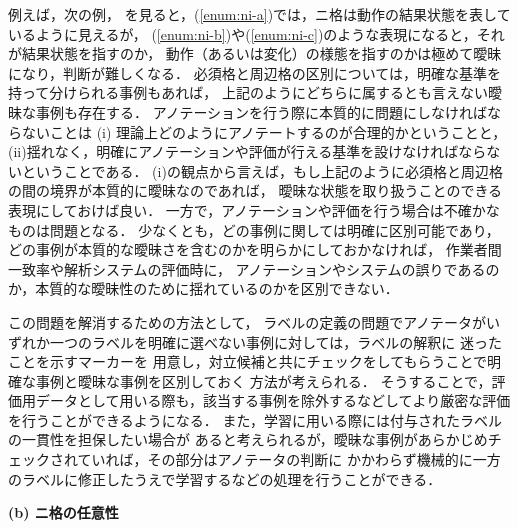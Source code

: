 \documentclass[japanese]{jnlp_1.4}
\begin{document}
例えば，次の例，
を見ると，(\ref{enum:ni-a})では，ニ格は動作の結果状態を表しているように見えるが，
(\ref{enum:ni-b})や(\ref{enum:ni-c})のような表現になると，それが結果状態を指すのか，
動作（あるいは変化）の様態を指すのかは極めて曖昧になり，判断が難しくなる．
必須格と周辺格の区別については，明確な基準を持って分けられる事例もあれば，
上記のようにどちらに属するとも言えない曖昧な事例も存在する．
アノテーションを行う際に本質的に問題にしなければならないことは
(i) 理論上どのようにアノテートするのが合理的かということと，
(ii)揺れなく，明確にアノテーションや評価が行える基準を設けなければならないということである．
(i)の観点から言えば，もし上記のように必須格と周辺格の間の境界が本質的に曖昧なのであれば，
曖昧な状態を取り扱うことのできる表現にしておけば良い．
一方で，アノテーションや評価を行う場合は不確かなものは問題となる．
少なくとも，どの事例に関しては明確に区別可能であり，
どの事例が本質的な曖昧さを含むのかを明らかにしておかなければ，
作業者間一致率や解析システムの評価時に，
アノテーションやシステムの誤りであるのか，本質的な曖昧性のために揺れているのかを区別できない．

この問題を解消するための方法として，
ラベルの定義の問題でアノテータがいずれか一つのラベルを明確に選べない事例に対しては，ラベルの解釈に
迷ったことを示すマーカーを
用意し，対立候補と共にチェックをしてもらうことで明確な事例と曖昧な事例を区別しておく
方法が考えられる．
そうすることで，評価用データとして用いる際も，該当する事例を除外するなどしてより厳密な評価を行うことができるようになる．
また，学習に用いる際には付与されたラベルの一貫性を担保したい場合が
あると考えられるが，曖昧な事例があらかじめチェックされていれば，その部分はアノテータの判断に
かかわらず機械的に一方のラベルに修正したうえで学習するなどの処理を行うことができる．

\noindent
{\bf (b) ニ格の任意性}
\end{document}
